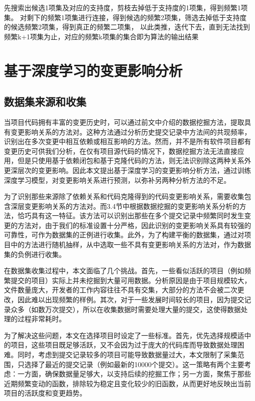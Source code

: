 先搜索出候选1项集及对应的支持度，剪枝去掉低于支持度的1项集，得到频繁1项集。
对剩下的频繁1项集进行连接，得到候选的频繁2项集，筛选去掉低于支持度的候选频繁2项集，得到真正的频繁二项集，
以此类推，迭代下去，直到无法找到频繁k+1项集为止，对应的频繁k项集的集合即为算法的输出结果


\section{基于深度学习的变更影响分析}

\subsection{数据集来源和收集}

当项目代码拥有丰富的变更历史时，可以通过前文中介绍的数据挖掘方法，提取具有变更影响关系的方法对。这种方法通过分析历史提交记录中方法间的共现频率，识别出在多次变更中相互依赖或相互影响的方法。然而，并不是所有软件项目都有变更历史可供我们分析，在仅有项目源代码的情况下，数据挖掘方法无法直接应用，但是只使用基于依赖闭包和基于克隆代码的方法，则无法识别除这两种关系外更深层次的变更影响。因此本文提出基于深度学习的变更影响分析方法，通过训练深度学习模型，对变更影响关系进行预测，以弥补另两种分析方法的不足。

为了识别那些来源除了依赖关系和代码克隆得到的代码变更影响关系，需要收集包含深层变更影响关系的方法对。而3.4节中根据数据挖掘的变更影响关系分析的方法，恰巧具有这一特征。该方法可以识别出那些在多个提交记录中频繁同时发生变更的方法对，由于我们的标准设置十分严格，因此识别的变更影响关系具有较强的可靠性，可作为数据集的正例进行收集。此外，为了构建平衡的数据集，通过对项目中的方法进行随机抽样，从中选取一些不具有变更影响关系的方法对，作为数据集的负例进行收集。

在数据集收集过程中，本文面临了几个挑战。首先，一些看似活跃的项目（例如频繁提交的项目）实际上并未挖掘到大量可用数据。分析原因是由于项目规模较大，文件数量庞大，开发者的工作内容往往不具有交集，大部分的方法不会被二次更改，因此难以出现频繁的样例。其次，对于一些发展时间较长的项目，因为提交记录众多（如数万次提交），所以在收集数据时需要处理大量的提交，这使得数据处理的过程非常耗时。

为了解决这些问题，本文在选择项目时设定了一些标准。首先，优先选择规模适中的项目，这些项目既足够活跃，又不会因为过于庞大的代码库而导致数据处理困难。同时，考虑到提交记录较多的项目可能导致数据量过大，本文限制了采集范围，只选择了最近的提交记录（例如最新的10000个提交）。这一策略有两个主要考虑：一方面，确保数据量足够大，以支持后续的挖掘工作；另一方面，聚焦于那些近期频繁变动的函数，排除较为稳定且变化较少的旧函数，从而更好地反映出当前项目的活跃度和变更趋势。

